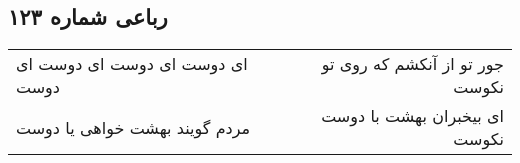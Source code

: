 \begin{center}
\section*{رباعی شماره ۱۲۳}
\label{sec:sh123}
\begin{longtable}{l p{0.5cm} r}
ای دوست ای دوست ای دوست ای دوست
&&
جور تو از آنکشم که روی تو نکوست
\\
مردم گویند بهشت خواهی یا دوست
&&
ای بیخبران بهشت با دوست نکوست
\\
\end{longtable}
\end{center}
